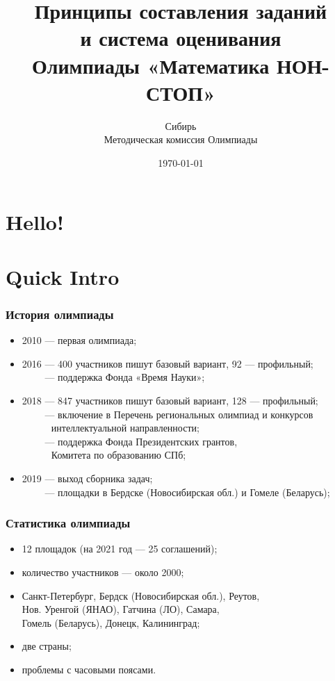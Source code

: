 \documentclass[aspectratio=1610,12pt]{beamer}
\title[Математика НОН-СТОП $\mid$ Семинар]
	{\bfseries Принципы составления заданий \\
		и система оценивания \\
		Олимпиады «Математика НОН-СТОП»}
\author[Б.~А.~Золотов, Е.~И.~Тодоров]
	{Сибирь \\ \vspace{0.3cm} Методическая комиссия Олимпиады}
\institute[\textcolor{white}{«Время науки», ЛНМО, ФПГ}]{}
\date{\today}
\begin{document}
\section[Приветствие]{Hello!}
\begin{frame}\titlepage\end{frame}

\section[Введение]{Quick Intro}



\begin{frame}\frametitle{История олимпиады}
\begin{itemize}
	\item 2010 — первая олимпиада;
	\item 2016 — 400 участников пишут базовый вариант, 92 --- профильный;\\
        $\phantom{2016}$ — поддержка Фонда «Время Науки»;
	\item 2018 — 847 участников пишут базовый вариант, 128 --- профильный;\\
        $\phantom{2018}$ — включение в Перечень региональных олимпиад и конкурсов\\
	$\phantom{2018 — }$\quad интеллектуальной направленности;\\
	$\phantom{2018}$ — поддержка Фонда Президентских грантов,\\
	$\phantom{2018 — }$\quad Комитета по образованию СПб;\\
	\item 2019 — выход сборника задач;\\
        $\phantom{2019}$ — площадки в Бердске (Новосибирская обл.) и Гомеле (Беларусь);\\
\end{itemize}\end{frame}

\begin{frame}\frametitle{Статистика олимпиады}
\begin{itemize}
	\item 12 площадок (на 2021 год — 25 соглашений);\\
	\item количество участников --- около 2000;\\
	\item Санкт-Петербург, Бердск (Новосибирская обл.), Реутов, \\
		Нов. Уренгой (ЯНАО), Гатчина (ЛО), Самара, \\
		Гомель (Беларусь), Донецк, Калининград;\\
	\item две страны;\\
	\item проблемы с часовыми поясами.
\end{itemize}\end{frame}
\end{document}
